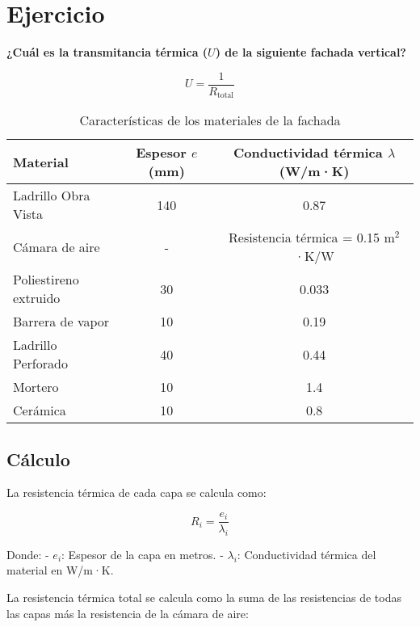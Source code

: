 \documentclass{article}
\begin{document}
\section*{Ejercicio}

\textbf{¿Cuál es la transmitancia térmica ($U$) de la siguiente fachada vertical?}

$$
U = \frac{1}{R_\text{total}}
$$

\begin{table}[h!]
\centering
\begin{tabular}{|l|c|c|}
\hline
\textbf{Material}            & \textbf{Espesor $e$ (mm)} & \textbf{Conductividad térmica $\lambda$ (W/m·K)} \\ \hline
Ladrillo Obra Vista          & 140                      & 0.87                                             \\ \hline
Cámara de aire               & -                        & Resistencia térmica = 0.15 m$^2$·K/W           \\ \hline
Poliestireno extruido        & 30                       & 0.033                                            \\ \hline
Barrera de vapor             & 10                       & 0.19                                             \\ \hline
Ladrillo Perforado           & 40                       & 0.44                                             \\ \hline
Mortero                      & 10                       & 1.4                                              \\ \hline
Cerámica                     & 10                       & 0.8                                              \\ \hline
\end{tabular}
\caption{Características de los materiales de la fachada}
\end{table}

\subsection*{Cálculo}

La resistencia térmica de cada capa se calcula como:

$$
R_i = \frac{e_i}{\lambda_i}
$$

Donde:
- $e_i$: Espesor de la capa en metros.
- $\lambda_i$: Conductividad térmica del material en W/m·K.

La resistencia térmica total se calcula como la suma de las resistencias de todas las capas más la resistencia de la cámara de aire:
\end{document}

